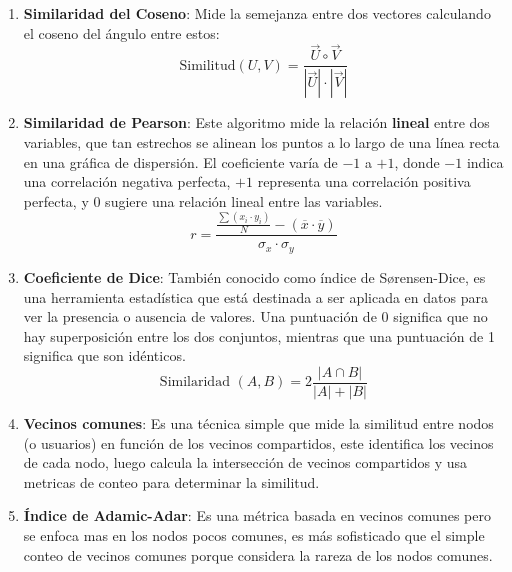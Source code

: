 \begin{enumerate}
    \item \textbf{Similaridad del Coseno}: Mide la semejanza entre dos vectores calculando el coseno del ángulo entre estos: \[\text{Similitud}(U,V)=\frac{\vec{U}\circ\vec{V}}{|\vec{U}|\cdot|\vec{V}|}\]
    \item \textbf{Similaridad de Pearson}: Este algoritmo mide la relación \textbf{lineal} entre dos variables, que tan estrechos se alinean los puntos a lo largo de una línea recta en una gráfica de dispersión. El coeficiente varía de $-1$ a $+1$, donde $-1$ indica una correlación negativa perfecta, $+1$ representa una correlación positiva perfecta, y $0$ sugiere una relación lineal entre las variables. \[r=\frac{\frac{\sum(x_{i}\cdot y_{i})}{N}-(\overline{x}\cdot \overline{y})}{\sigma_{x}\cdot\sigma_{y}}\]
    \item \textbf{Coeficiente de Dice}: También conocido como índice de Sørensen-Dice, es una herramienta estadística que está destinada a ser aplicada en datos para ver la presencia o ausencia de valores. Una puntuación de 0 significa que no hay superposición entre los dos conjuntos, mientras que una puntuación de 1 significa que son idénticos. \[\text{Similaridad }(A,B)=2\frac{|A\cap B|}{|A|+|B|}\]
    \item \textbf{Vecinos comunes}: Es una técnica simple que mide la similitud entre nodos (o usuarios) en función de los vecinos compartidos, este identifica los vecinos de cada nodo, luego calcula la intersección de vecinos compartidos y usa metricas de conteo para determinar la similitud.
    \item \textbf{Índice de Adamic-Adar}: Es una métrica basada en vecinos comunes pero se enfoca mas en los nodos pocos comunes, es más sofisticado que el simple conteo de vecinos comunes porque considera la rareza de los nodos comunes.
\end{enumerate}

